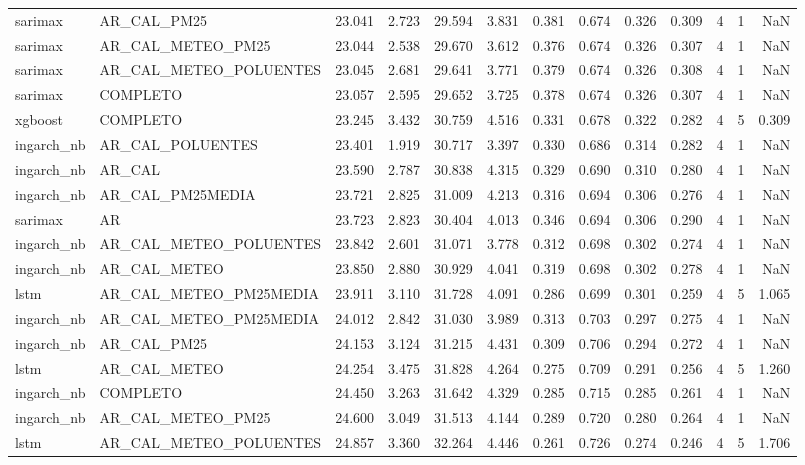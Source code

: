 \begin{tabular}{llrrrrrrrrrrr}
sarimax & AR_CAL_PM25 & 23.041 & 2.723 & 29.594 & 3.831 & 0.381 & 0.674 & 0.326 & 0.309 & 4 & 1 & NaN \\
sarimax & AR_CAL_METEO_PM25 & 23.044 & 2.538 & 29.670 & 3.612 & 0.376 & 0.674 & 0.326 & 0.307 & 4 & 1 & NaN \\
sarimax & AR_CAL_METEO_POLUENTES & 23.045 & 2.681 & 29.641 & 3.771 & 0.379 & 0.674 & 0.326 & 0.308 & 4 & 1 & NaN \\
sarimax & COMPLETO & 23.057 & 2.595 & 29.652 & 3.725 & 0.378 & 0.674 & 0.326 & 0.307 & 4 & 1 & NaN \\
xgboost & COMPLETO & 23.245 & 3.432 & 30.759 & 4.516 & 0.331 & 0.678 & 0.322 & 0.282 & 4 & 5 & 0.309 \\
ingarch_nb & AR_CAL_POLUENTES & 23.401 & 1.919 & 30.717 & 3.397 & 0.330 & 0.686 & 0.314 & 0.282 & 4 & 1 & NaN \\
ingarch_nb & AR_CAL & 23.590 & 2.787 & 30.838 & 4.315 & 0.329 & 0.690 & 0.310 & 0.280 & 4 & 1 & NaN \\
ingarch_nb & AR_CAL_PM25MEDIA & 23.721 & 2.825 & 31.009 & 4.213 & 0.316 & 0.694 & 0.306 & 0.276 & 4 & 1 & NaN \\
sarimax & AR & 23.723 & 2.823 & 30.404 & 4.013 & 0.346 & 0.694 & 0.306 & 0.290 & 4 & 1 & NaN \\
ingarch_nb & AR_CAL_METEO_POLUENTES & 23.842 & 2.601 & 31.071 & 3.778 & 0.312 & 0.698 & 0.302 & 0.274 & 4 & 1 & NaN \\
ingarch_nb & AR_CAL_METEO & 23.850 & 2.880 & 30.929 & 4.041 & 0.319 & 0.698 & 0.302 & 0.278 & 4 & 1 & NaN \\
lstm & AR_CAL_METEO_PM25MEDIA & 23.911 & 3.110 & 31.728 & 4.091 & 0.286 & 0.699 & 0.301 & 0.259 & 4 & 5 & 1.065 \\
ingarch_nb & AR_CAL_METEO_PM25MEDIA & 24.012 & 2.842 & 31.030 & 3.989 & 0.313 & 0.703 & 0.297 & 0.275 & 4 & 1 & NaN \\
ingarch_nb & AR_CAL_PM25 & 24.153 & 3.124 & 31.215 & 4.431 & 0.309 & 0.706 & 0.294 & 0.272 & 4 & 1 & NaN \\
lstm & AR_CAL_METEO & 24.254 & 3.475 & 31.828 & 4.264 & 0.275 & 0.709 & 0.291 & 0.256 & 4 & 5 & 1.260 \\
ingarch_nb & COMPLETO & 24.450 & 3.263 & 31.642 & 4.329 & 0.285 & 0.715 & 0.285 & 0.261 & 4 & 1 & NaN \\
ingarch_nb & AR_CAL_METEO_PM25 & 24.600 & 3.049 & 31.513 & 4.144 & 0.289 & 0.720 & 0.280 & 0.264 & 4 & 1 & NaN \\
lstm & AR_CAL_METEO_POLUENTES & 24.857 & 3.360 & 32.264 & 4.446 & 0.261 & 0.726 & 0.274 & 0.246 & 4 & 5 & 1.706 \\

\end{tabular}
